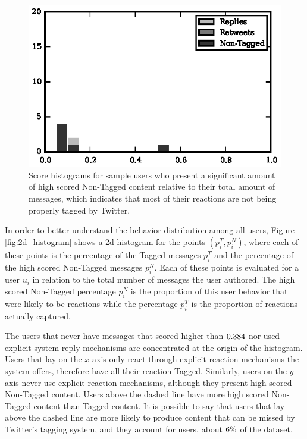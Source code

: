 \begin{figure}[!tb]
\includegraphics[scale=0.55]{./figures/196322186_histogram.eps}
\caption{Score histograms for sample users who present a significant amount of high scored Non-Tagged content relative to their total amount of messages, which indicates that most of their reactions are not being properly tagged by Twitter.}
\label{fig:users_reponse_histograms}
\end{figure}


In order to better understand the behavior distribution among all users, Figure \ref{fig:2d_histogram} shows a 2d-histogram for the points $(p_i^T, p_i^N)$, where each of these points is the percentage of the Tagged messages $p_i^T$ and the percentage of the high scored Non-Tagged messages $p_i^N$.  Each of these points is evaluated for a user $u_i$ in relation to the total number of messages the user authored.
The high scored Non-Tagged percentage $p_i^N$ is the proportion of this user behavior that were likely to be reactions while the percentage $p_i^T$ is the proportion of reactions actually captured.


The \usersScoreZero{} users that never have messages that scored higher than $0.384{}$ nor used explicit system reply mechanisms are concentrated at the origin of the histogram.
Users that lay on the $x$-axis only react through explicit reaction mechanisms the system offers, therefore have all their reaction Tagged. Similarly, users on the $y$-axis never use explicit reaction mechanisms, although they present high scored Non-Tagged content. Users above the dashed line have more high scored Non-Tagged content than Tagged content. It is possible to say that users that lay above the dashed line are more likely to produce content that can be missed by Twitter's tagging system, and they account for \usersAboveLine{} users, about $6{}\%$ of the dataset. 

